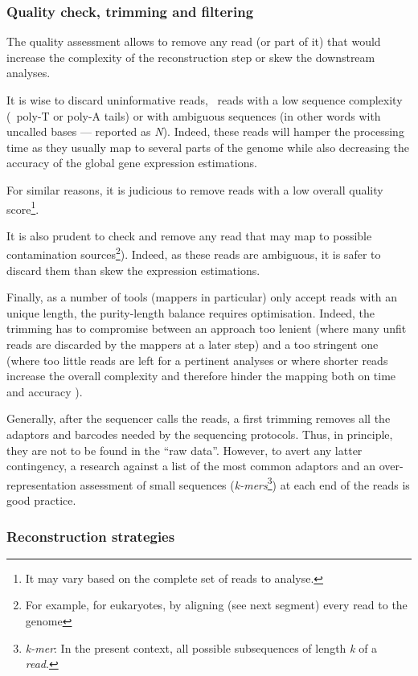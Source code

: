 \subsubsection{Quality check, trimming and filtering}\label{subsub:trim}

The quality assessment allows to remove any read (or part of it) that would
increase the complexity of the reconstruction step or skew the downstream analyses.

It is wise to discard uninformative reads, \ie\ reads with a low sequence
complexity (\eg\ poly-T or poly-A tails) or with ambiguous sequences (in other
words with uncalled bases --- reported as \emph{N}).
Indeed, these reads will hamper the processing time as they
usually map to several parts of the genome while also decreasing the accuracy of
the global gene expression estimations.

For similar reasons, it is judicious to remove reads with a low overall quality
score\footnote{It may vary based on the complete set of reads to analyse.}.

It is also prudent to check and remove any read that may map to possible
contamination sources\footnote{For example, for eukaryotes, by aligning (see next
segment) every read to the  genome}).
Indeed, as these reads are ambiguous, it is safer
to discard them than skew the expression estimations.

Finally, as a number of tools (mappers in particular) only accept reads
with an unique length, the purity-length balance requires optimisation.
Indeed, the trimming has to compromise between
an approach too lenient (where many unfit reads are discarded
by the mappers at a later step) and
a too stringent one (where too little reads are left for a pertinent analyses or
where shorter reads increase the overall complexity and therefore hinder
the mapping both on time and accuracy ).

\NB Generally, after the sequencer calls the reads, a first trimming removes
all the adaptors and barcodes needed by the sequencing protocols. Thus,
in principle, they are not to be found in the \enquote{raw data}.
However, to avert any latter contingency, a research against
a list of the most common adaptors and an over-representation assessment of small
sequences (\emph{k-mers}\footnote{\emph{k-mer}: In the present context, all
possible subsequences of length
\emph{k} of a \emph{read}.}) at each end of the reads is good practice.


\subsubsection{Reconstruction strategies}

